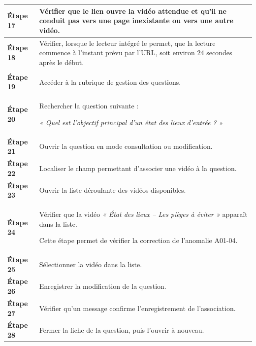 \begin{longtable}{
    |>{\raggedright\arraybackslash}p{}
    |>{\raggedright\arraybackslash}p{}|
}
\textbf{Étape 17}
&
Vérifier que le lien ouvre la vidéo attendue et qu'il ne conduit pas vers
une page inexistante ou vers une autre vidéo.
\\
\hline

\textbf{Étape 18}
&
Vérifier, lorsque le lecteur intégré le permet, que la lecture commence à
l'instant prévu par l'URL, soit environ 24 secondes après le début.
\\
\hline


\rowcolor{orange!50}
\multicolumn{2}{|c|}{
    \textbf{Association de la vidéo à une question}
}
\\
\hline

\textbf{Étape 19}
&
Accéder à la rubrique de gestion des questions.
\\
\hline

\textbf{Étape 20}
&
Rechercher la question suivante :

\textit{« Quel est l'objectif principal d'un état des lieux d'entrée ? »}
\\
\hline

\textbf{Étape 21}
&
Ouvrir la question en mode consultation ou modification.
\\
\hline

\textbf{Étape 22}
&
Localiser le champ permettant d'associer une vidéo à la question.
\\
\hline

\textbf{Étape 23}
&
Ouvrir la liste déroulante des vidéos disponibles.
\\
\hline

\textbf{Étape 24}
&
Vérifier que la vidéo
\textit{« État des lieux -- Les pièges à éviter »}
apparaît dans la liste.

Cette étape permet de vérifier la correction de l'anomalie A01-04.
\\
\hline

\textbf{Étape 25}
&
Sélectionner la vidéo dans la liste.
\\
\hline

\textbf{Étape 26}
&
Enregistrer la modification de la question.
\\
\hline

\textbf{Étape 27}
&
Vérifier qu'un message confirme l'enregistrement de l'association.
\\
\hline

\textbf{Étape 28}
&
Fermer la fiche de la question, puis l'ouvrir à nouveau.
\\
\hline


\end{longtable}
